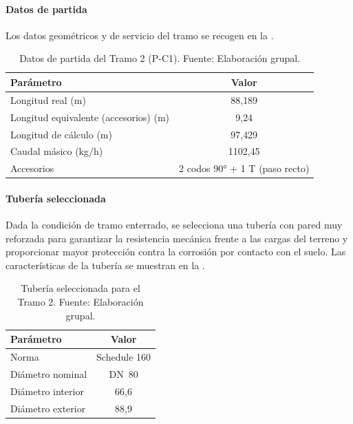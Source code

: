 \documentclass[12pt]{article}
\begin{document}
\paragraph{Datos de partida}

Los datos geométricos y de servicio del tramo se recogen en la .

\begin{table}[H]
	\centering
	\caption{Datos de partida del Tramo 2 (P-C1). Fuente: Elaboración grupal.}
	\label{tab:datos-tramo2}
	\begin{tabular}{lc}
		\toprule
		\textbf{Parámetro}                    & \textbf{Valor}                 \\
		\midrule
		Longitud real (m)                     & 88{,}189                       \\
		Longitud equivalente (accesorios) (m) & 9{,}24                         \\
		Longitud de cálculo (m)               & 97{,}429                       \\
		Caudal másico (kg/h)                  & 1102{,}45                      \\
		Accesorios                            & 2 codos 90° + 1 T (paso recto) \\
		\bottomrule
	\end{tabular}
\end{table}

\paragraph{Tubería seleccionada}

Dada la condición de tramo enterrado, se selecciona una tubería con pared muy reforzada para garantizar la resistencia mecánica frente a las cargas del terreno y proporcionar mayor protección contra la corrosión por contacto con el suelo. Las características de la tubería se muestran en la .

\begin{table}[H]
	\centering
	\caption{Tubería seleccionada para el Tramo 2. Fuente: Elaboración grupal.}
	\label{tab:tuberia-tramo2}
	\begin{tabular}{lc}
		\toprule
		\textbf{Parámetro} & \textbf{Valor} \\
		\midrule
		Norma              & Schedule 160   \\
		Diámetro nominal   & DN~80          \\
		Diámetro interior  & 66{,}6         \\
		Diámetro exterior  & 88{,}9         \\
		\bottomrule
	\end{tabular}
\end{table}
\end{document}
